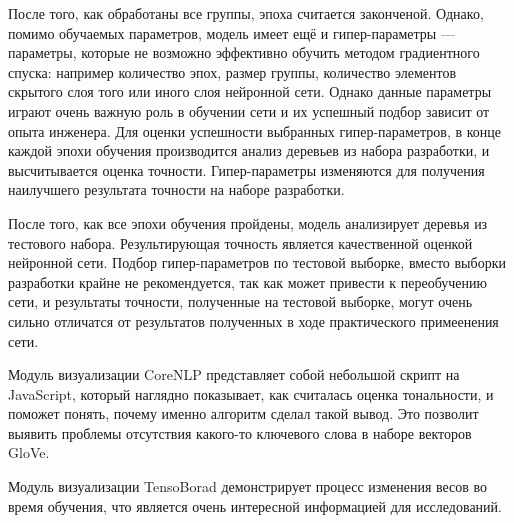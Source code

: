 После того, как обработаны все группы, эпоха считается законченой. Однако, помимо обучаемых параметров, модель имеет ещё и гипер-параметры --- параметры, которые не возможно эффективно обучить методом градиентного спуска: например количество эпох, размер группы, количество элементов скрытого слоя того или иного слоя нейронной сети. Однако данные параметры играют очень важную роль в обучении сети и их успешный подбор зависит от опыта инженера. Для оценки успешности выбранных гипер-параметров, в конце каждой эпохи обучения производится анализ деревьев из набора разработки, и высчитывается оценка точности. Гипер-параметры изменяются для получения наилучшего результата точности на наборе разработки.

После того, как все эпохи обучения пройдены, модель анализирует деревья из тестового набора. Результирующая точность является качественной оценкой нейронной сети. Подбор гипер-параметров по тестовой выборке, вместо выборки разработки крайне не рекомендуется, так как может привести к переобучению сети, и результаты точности, полученные на тестовой выборке, могут очень сильно отличатся от результатов полученных в ходе практического примеенения сети.

Модуль визуализации CoreNLP представляет собой небольшой скрипт на JavaScript, который наглядно показывает, как считалась оценка тональности, и поможет понять, почему именно алгоритм сделал такой вывод. Это позволит выявить проблемы отсутствия какого-то ключевого слова в наборе векторов GloVe.

Модуль визуализации TensoBorad демонстрирует процесс изменения весов во время обучения, что является очень интересной информацией для исследований.